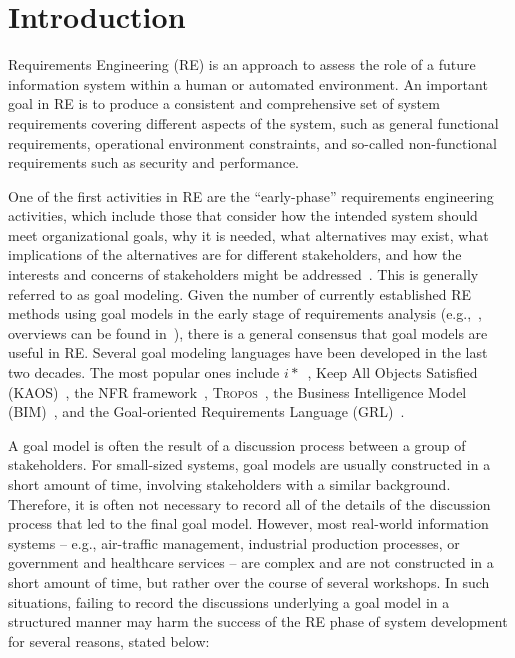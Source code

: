 \section{Introduction}
\label{sect:introduction}

Requirements Engineering (RE) is an approach to assess the role of a future information system within a human or automated environment. An important goal in RE is to produce a consistent and comprehensive set of system requirements covering different aspects of the system, such as general functional requirements, operational environment constraints, and so-called non-functional requirements such as security and performance. 

One of the first activities in RE are the ``early-phase'' requirements engineering activities, which include those that consider how the intended system should meet organizational goals, why it is needed, what alternatives may exist, what implications of the alternatives are for different stakeholders, and how the interests and concerns of stakeholders might be addressed~\cite{yu1997towards}. This is generally referred to as goal modeling. Given the number of currently established RE methods using goal models in the early stage of requirements analysis (e.g.,~\cite{liu2004designing,donzelli2004goal,dardenne1993goal,chung2012non,castro2002towards}, overviews can be found in~\cite{van2001goal,kavakliL05}), there is a general consensus that goal models are useful in RE. Several goal modeling languages have been developed in the last two decades. The most popular ones include $i*$~\cite{Yu:1997:TMR:827255.827807}, Keep All Objects Satisfied (KAOS)~\cite{van2008requirements}, the NFR framework~\cite{chung2012non}, \textsc{Tropos}~\cite{giorgini2005goal}, the Business Intelligence Model (BIM)~\cite{horkoff2014strategic}, and the Goal-oriented Requirements Language (GRL)~\cite{Amyot:2010:EGM:1841349.1841356}.

A goal model is often the result of a discussion process between a group of stakeholders. For small-sized systems, goal models are usually constructed in a short amount of time, involving stakeholders with a similar background. Therefore, it is often not necessary to record all of the details of the discussion process that led to the final goal model. However, most real-world information systems -- e.g., air-traffic management, industrial production processes, or government and healthcare services -- are complex and are not constructed in a short amount of time, but rather over the course of several workshops. In such situations, failing to record the discussions underlying a goal model in a structured manner may harm the success of the RE phase of system development for several reasons, stated below: 

